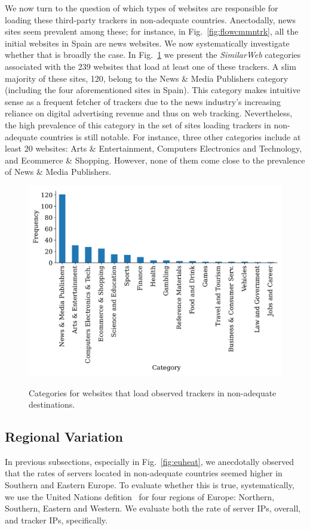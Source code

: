 We now turn to the question of which types of websites
are responsible for loading these third-party trackers in
non-adequate countries. Anectodally, news sites seem prevalent among these;
for instance, in Fig.~\ref{fig:flowcmmntrk}, all the initial websites in Spain
are news websites. 
We now systematically investigate whether that is broadly the case.
In Fig.~\ref{fig:categories} we
present the \textit{SimilarWeb} categories~\cite{SimilarWeb} associated with the 239 websites
that load at least one of these trackers. A slim majority of these sites, 120, 
belong to the News \& Media Publishers category (including the four aforementioned sites in Spain). 
This category makes intuitive sense
as a frequent fetcher of trackers due to the news industry's increasing reliance
on digital advertising revenue and thus on web tracking. Nevertheless, the high
prevalence of this category in the set of sites loading trackers in non-adequate countries is still notable.
For instance, three other categories include at least 20 websites: Arts \& Entertainment, Computers Electronics and Technology,
and Ecommerce \& Shopping. However, none of them come close to the prevalence of News \& Media Publishers.

\begin{figure}[t]
    \centering
    \includegraphics[width=\linewidth]{figures/bar-plot-category.pdf}\\
    \caption{Categories for websites that load observed trackers in non-adequate destinations.}
\label{fig:categories}
\end{figure}


\subsection{Regional Variation}
\label{sec:regionalvariation}
In previous subsections, especially in 
Fig.~\ref{fig:euheat}, we anecdotally observed that the rates of 
servers located in non-adequate countries seemed higher in Southern and
Eastern Europe. To evaluate whether this is true, systematically,
we use the United Nations defition~\cite{uneu} for four regions of Europe: 
Northern, Southern, Eastern and Western.
We evaluate both the rate of server IPs, overall, and tracker IPs, specifically.

